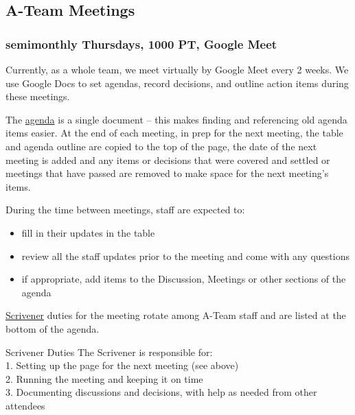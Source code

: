\documentclass[
  letterpaper,
  DIV=11,
  numbers=noendperiod]{scrreprt}
\providecommand{\tightlist}{%
  \setlength{\itemsep}{0pt}\setlength{\parskip}{0pt}}\usepackage{longtable,booktabs,array}
\begin{document}
\subsection{A-Team Meetings}\label{ateam-meetings}

\subsubsection{semimonthly Thursdays, 1000 PT, Google
Meet}\label{semimonthly-thursdays-1000-pt-google-meet}

Currently, as a whole team, we meet virtually by Google Meet every 2
weeks. We use Google Docs to set agendas, record decisions, and outline
action items during these meetings.

The
\href{https://docs.google.com/document/d/1WvOqt77kHU4_72IQFUuYN3M9kF2xTi56QtwpRFHf6C4/edit\#heading=h.32mfp9s1k5bh}{agenda}
is a single document -- this makes finding and referencing old agenda
items easier. At the end of each meeting, in prep for the next meeting,
the table and agenda outline are copied to the top of the page, the date
of the next meeting is added and any items or decisions that were
covered and settled or meetings that have passed are removed to make
space for the next meeting's items.

During the time between meetings, staff are expected to:

\begin{itemize}
\tightlist
\item
  fill in their updates in the table\\
\item
  review all the staff updates prior to the meeting and come with any
  questions\\
\item
  if appropriate, add items to the Discussion, Meetings or other
  sections of the agenda
\end{itemize}

\href{https://www.wordnik.com/words/scrivener}{Scrivener} duties for the
meeting rotate among A-Team staff and are listed at the bottom of the
agenda.

Scrivener Duties The Scrivener is responsible for:\\
1. Setting up the page for the next meeting (see above)\\
2. Running the meeting and keeping it on time\\
3. Documenting discussions and decisions, with help as needed from other
attendees
\end{document}
